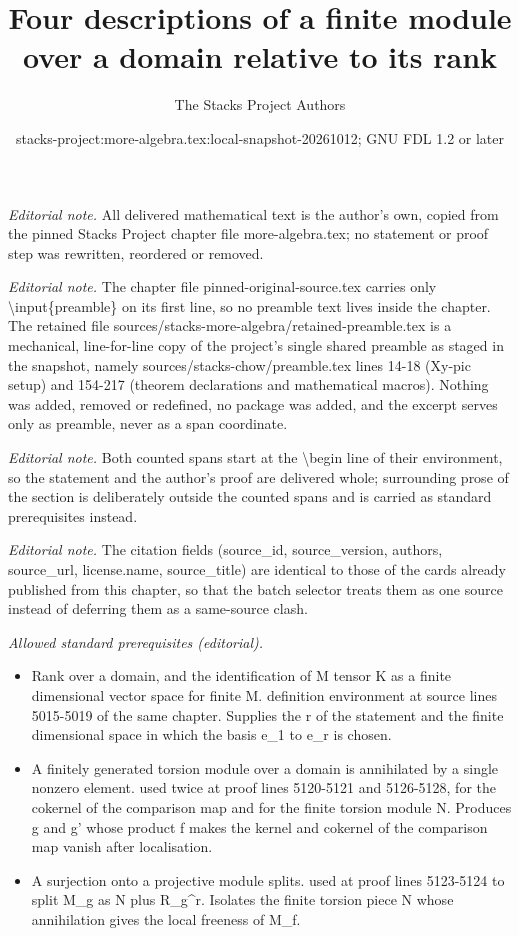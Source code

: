 \documentclass[10pt,a4paper]{amsart}
\title{Four descriptions of a finite module over a domain relative to its rank}
\author{The Stacks Project Authors}
\date{stacks-project:more-algebra.tex:local-snapshot-20261012; GNU FDL 1.2 or later}
\theoremstyle{plain}
\theoremstyle{definition}
\theoremstyle{remark}
\numberwithin{equation}{subsection}
\begin{document}
\maketitle
\setcounter{subsection}{1}
\noindent\textit{Editorial note.} All delivered mathematical text is the author's own, copied from the pinned Stacks Project chapter file more-algebra.tex; no statement or proof step was rewritten, reordered or removed.\par\medskip
\noindent\textit{Editorial note.} The chapter file pinned-original-source.tex carries only \textbackslash{}input\{preamble\} on its first line, so no preamble text lives inside the chapter. The retained file sources/stacks-more-algebra/retained-preamble.tex is a mechanical, line-for-line copy of the project's single shared preamble as staged in the snapshot, namely sources/stacks-chow/preamble.tex lines 14-18 (Xy-pic setup) and 154-217 (theorem declarations and mathematical macros). Nothing was added, removed or redefined, no package was added, and the excerpt serves only as preamble, never as a span coordinate.\par\medskip
\noindent\textit{Editorial note.} Both counted spans start at the \textbackslash{}begin line of their environment, so the statement and the author's proof are delivered whole; surrounding prose of the section is deliberately outside the counted spans and is carried as standard prerequisites instead.\par\medskip
\noindent\textit{Editorial note.} The citation fields (source\_id, source\_version, authors, source\_url, license.name, source\_title) are identical to those of the cards already published from this chapter, so that the batch selector treats them as one source instead of deferring them as a same-source clash.\par\medskip
\noindent\textit{Allowed standard prerequisites (editorial).}\begin{itemize}
\item Rank over a domain, and the identification of M tensor K as a finite dimensional vector space for finite M. definition environment at source lines 5015-5019 of the same chapter. Supplies the r of the statement and the finite dimensional space in which the basis e\_1 to e\_r is chosen.
\item A finitely generated torsion module over a domain is annihilated by a single nonzero element. used twice at proof lines 5120-5121 and 5126-5128, for the cokernel of the comparison map and for the finite torsion module N. Produces g and g' whose product f makes the kernel and cokernel of the comparison map vanish after localisation.
\item A surjection onto a projective module splits. used at proof lines 5123-5124 to split M\_g as N plus R\_g\textasciicircum{}r. Isolates the finite torsion piece N whose annihilation gives the local freeness of M\_f.
\end{itemize}\medskip
\end{document}
